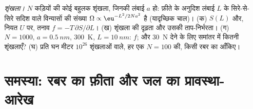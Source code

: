 \begin{exercise}[$\star\star\star$]\label{exo:b2:thermodynamic-potentials:12}
\emph{शृंखला।} $N$ कड़ियों की कोई बहुलक शृंखला, जिनकी लंबाई $a$ हो: फ़ीते के अनुदिश
लंबाई $L$ के सिरे-से-सिरे सदिश वाले विन्यासों की
संख्या $\Omega \propto \eu^{-L^2/2Na^2}$ है (यादृच्छिक चाल)। (क) $S(L)$
और, नियत $U$ पर, तनाव $f = -T\,\partial S/\partial L$। (ख) शृंखला की
दृढ़ता और उसकी ताप-निर्भरता। (ग) $N = 1000$, $a =
\qty{0.5}{nm}$, \qty{300}{K}, $L = \qty{10}{nm}$: $f$; और \qty{30}{N} देने के लिए
समांतर में कितनी शृंखलाएँ? (घ) प्रति घन मीटर $10^{26}$ शृंखलाओं वाले, हर एक
$N = 100$ की, किसी रबर का  आँकिए।
\end{exercise}

\section{समस्या: रबर का फ़ीता और जल का प्रावस्था-आरेख}

